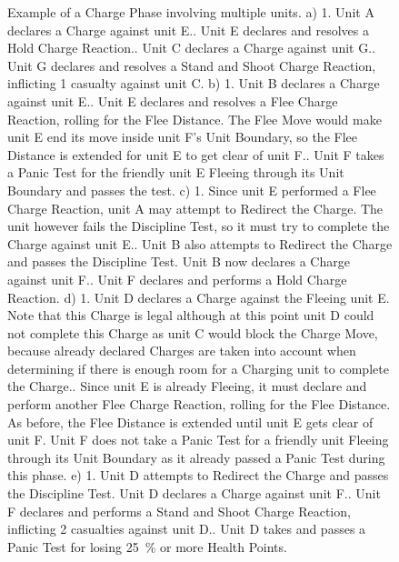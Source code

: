 \begin{figure}[!htbp]
	\begin{minipage}{0.61\textwidth}
	\renewcommand{\figbiglettersize}{12}
	\def\svgwidth{\textwidth}
	
	\end{minipage}\hfill\begin{minipage}{0.37\textwidth}
	\caption{Example of a Charge Phase involving multiple units.\captionpar
	a) 1. Unit A declares a Charge against unit E.. Unit E declares and resolves a Hold Charge Reaction.. Unit C declares a Charge against unit G.. Unit G declares and resolves a Stand and Shoot Charge Reaction, inflicting 1 casualty against unit C.\captionpar
	b) 1. Unit B declares a Charge against unit E.. Unit E declares and resolves a Flee Charge Reaction, rolling  for the Flee Distance. The Flee Move would make unit E end its move inside unit F's Unit Boundary, so the Flee Distance is extended for unit E to get clear of unit F.. Unit F takes a Panic Test for the friendly unit E Fleeing through its Unit Boundary and passes the test.\captionpar
	c) 1. Since unit E performed a Flee Charge Reaction, unit A may attempt to Redirect the Charge. The unit however fails the Discipline Test, so it must try to complete the Charge against unit E.. Unit B also attempts to Redirect the Charge and passes the Discipline Test. Unit B now declares a Charge against unit F.. Unit F declares and performs a Hold Charge Reaction.\captionpar
	d) 1. Unit D declares a Charge against the Fleeing unit E. Note that this Charge is legal although at this point unit D could not complete this Charge as unit C would block the Charge Move, because already declared Charges are taken into account when determining if there is enough room for a Charging unit to complete the Charge.. Since unit E is already Fleeing, it must declare and perform another Flee Charge Reaction, rolling  for the Flee Distance. As before, the Flee Distance is extended until unit E gets clear of unit F. Unit F does not take a Panic Test for a friendly unit Fleeing through its Unit Boundary as it already passed a Panic Test during this phase.\captionpar
	e) 1. Unit D attempts to Redirect the Charge and passes the Discipline Test. Unit D declares a Charge against unit F.. Unit F declares and performs a Stand and Shoot Charge Reaction, inflicting 2 casualties against unit D.. Unit D takes and passes a Panic Test for losing \SI{25}{\percent} or more Health Points.%
	}
	\label{figure/example_of_charge_phase_one}
	\end{minipage}
\end{figure}

